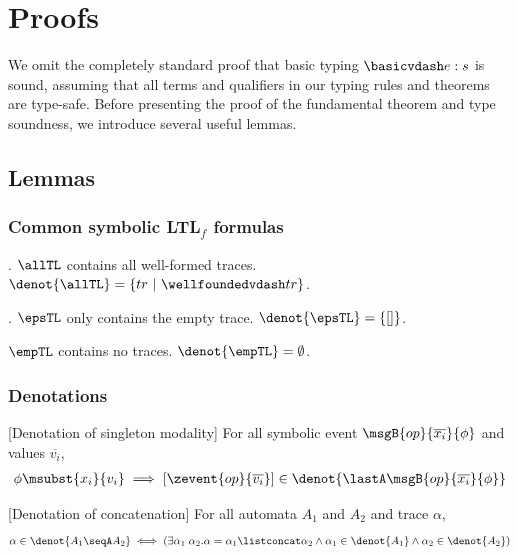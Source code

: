 \newpage
\section{Proofs}\label{sec:tech:proof}

We omit the completely standard proof that basic typing
\(\basicvdash e : s\) is sound, assuming that all terms and qualifiers
in our typing rules and theorems are type-safe. Before presenting the
proof of the fundamental theorem and type soundness, we introduce
several useful lemmas.

\subsection{Lemmas}

\subsubsection{Common symbolic LTL$_f$ formulas}

\begin{lemma}\label{lemma:allTL}. $\allTL$ contains
  all well-formed traces.
  $\denot{\allTL} = \{ tr ~|~ \wellfoundedvdash tr \}$.
\end{lemma}

\begin{lemma}\label{lemma:espTL}. $\epsTL$ only contains the empty trace. $\denot{\epsTL} = \{ [] \}$.
\end{lemma}

\begin{lemma}\label{lemma:empTL} $\empTL$ contains no
  traces. $\denot{\empTL} = \emptyset$.
\end{lemma}

\subsubsection{Denotations}

\begin{lemma}\label{lemma:lastA-denot}[Denotation of singleton modality] For all symbolic event $\msgB{op}{\overline{x_i}}{\phi}$ and values $\overline{v_i}$,
{\small\begin{align*}
    \phi\msubst{x_i}{v_i} \implies
    [\zevent{op}{\overline{v_i}}] \in \denot{\lastA\msgB{op}{\overline{x_i}}{\phi}}
\end{align*}}
\end{lemma}

\begin{lemma}\label{lemma:seqA-denot}[Denotation of concatenation] For all automata $A_1$ and $A_2$ and trace $\alpha$,
{\small\begin{align*}
    \alpha \in \denot{A_1 \seqA A_2} \iff (\exists \alpha_1\;\alpha_2. \alpha = \alpha_1 \listconcat \alpha_2 \land \alpha_1 \in \denot{A_1} \land \alpha_2 \in \denot{A_2})
\end{align*}}
\end{lemma}


